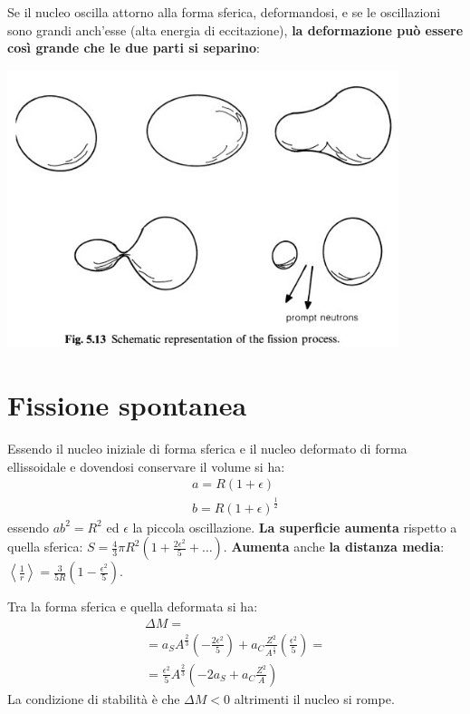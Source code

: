 \documentclass[a4paper,11pt,twoside,openany]{book}
\theoremstyle{definition}
\theoremstyle{plain}
\theoremstyle{plain}
\theoremstyle{definition}
\begin{document}
Se il nucleo oscilla attorno alla forma sferica, deformandosi, e se le oscillazioni sono grandi anch'esse (alta energia di eccitazione), \textbf{la deformazione può essere così grande che le due parti si separino}:

\begin{center}
\includegraphics[width=4.5in]{immagini/fission.jpg} %
\end{center}

\section{Fissione spontanea} %
Essendo il nucleo iniziale di forma sferica e il nucleo deformato di forma ellissoidale e dovendosi conservare il volume si ha:
\begin{equation*}\begin{split}
a=R\left(1+\epsilon\right)\\
b=R\left(1+\epsilon\right)^{\frac{1}{2}}
\end{split}\end{equation*}
essendo $ab^2=R^2$ ed $\epsilon$ la piccola oscillazione. \textbf{La superficie aumenta} rispetto a quella sferica: $S=\frac{4}{3}\pi R^2\left(1+\frac{2\epsilon^2}{5}+\dots\right)$. \textbf{Aumenta} anche \textbf{la distanza media}: $\left\langle \frac{1}{r} \right\rangle=\frac{3}{5R}\left(1-\frac{\epsilon^2}{5}\right)$.

Tra la forma sferica e quella deformata si ha:
\begin{equation}\begin{split}
\Delta M=\\
=a_SA^{\frac{2}{3}}\left(-\frac{2\epsilon^2}{5}\right)+a_C\frac{Z^2}{A^{\frac{1}{3}}}\left(\frac{\epsilon^2}{5}\right)=\\
=\frac{\epsilon^2}{5}A^{\frac{2}{3}}\left(-2a_S+a_C\frac{Z^2}{A}\right)
\end{split}\end{equation}
La condizione di stabilità è che $\Delta M<0$ altrimenti il nucleo si rompe.
\end{document}
